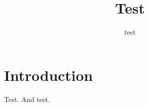 \documentclass{article}
\title{Test}
\author{test}
\begin{document}
\maketitle

\section{Introduction}

Test.\cite{zeng2018chinese} And test.

\newpage



\end{document}

